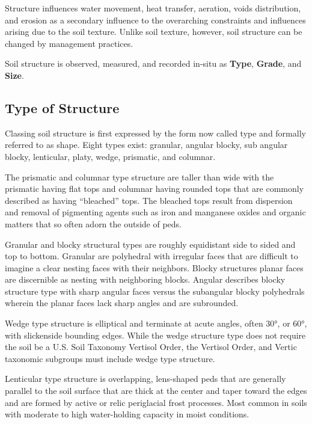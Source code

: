 \documentclass[letterpaper, 12pt]{article}
\begin{document}
Structure influences water movement, heat transfer, aeration, voids distribution, and erosion as a secondary influence to the overarching constraints and influences arising due to the soil texture. Unlike soil texture, however, soil structure can be changed by management practices.
    
Soil structure is observed, measured, and recorded in-situ as \textbf{Type}, \textbf{Grade}, and \textbf{Size}.
    
\subsection{Type of Structure}
    
Classing soil structure is first expressed by the form now called type and formally referred to as shape. Eight types exist: granular, angular blocky, sub angular blocky, lenticular, platy, wedge, prismatic, and columnar.

The prismatic and columnar type structure are taller than wide with the prismatic having flat tops and columnar having rounded tops that are commonly described as having \enquote{bleached} tops. The bleached tops result from dispersion and removal of pigmenting agents such as iron and manganese oxides and organic matters that so often adorn the outside of peds.

Granular and blocky structural types are roughly equidistant side to sided and top to bottom. Granular are polyhedral with irregular faces that are difficult to imagine a clear nesting faces with their neighbors. Blocky structures planar faces are discernible as nesting with neighboring blocks. Angular describes blocky structure type with sharp angular faces versus the subangular blocky polyhedrals wherein the planar faces lack sharp angles and are subrounded.

Wedge type structure is elliptical and terminate at acute angles, often \ang{30}, or \ang{60}, with slickenside bounding edges. While the wedge structure type does not require the soil be a U.S. Soil Taxonomy Vertisol Order, the Vertisol Order, and Vertic taxonomic subgroups must include wedge type structure.

Lenticular type structure is overlapping, lens-shaped peds that are  generally parallel to the soil surface that are thick at the center and taper toward the edges and are formed by active or relic periglacial frost processes. Most common in soils with moderate to high water-holding capacity in moist conditions.
\end{document}
